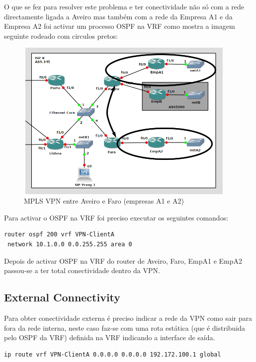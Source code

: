\documentclass[11pt,a4paper]{report}
\begin{document}
O que se fez para resolver este problema e ter conectividade não só com a rede directamente ligada a Aveiro mas também com a rede da Empresa A1 e da Empresa A2 foi activar um processo OSPF na VRF como mostra a imagem seguinte rodeado com circulos pretos:\\

\begin{figure}[H]
\centerline{\includegraphics[width=300pt]{network_vpn.png}}
\caption{MPLS VPN entre Aveiro e Faro (empresas A1 e A2)}
\label{schema}
\end{figure}

Para activar o OSPF na VRF foi preciso executar os seguintes comandos:\\

\begin{lstlisting}[caption=VPN - Suporte de OSPF entre o PE e o CE]
router ospf 200 vrf VPN-ClientA
 network 10.1.0.0 0.0.255.255 area 0
\end{lstlisting}

Depois de activar OSPF na VRF do router de Aveiro, Faro, EmpA1 e EmpA2 passou-se a ter total conectividade dentro da VPN.

\subsection{External Connectivity}

Para obter conectividade externa é preciso indicar a rede da VPN como sair para fora da rede interna, neste caso faz-se com uma rota estática (que é distribuida pelo OSPF da VRF) definida na VRF indicando a interface de saída.\\

\begin{lstlisting}[caption=VPN - Rota de saída da VPN-ClientA]
ip route vrf VPN-ClientA 0.0.0.0 0.0.0.0 192.172.100.1 global
\end{lstlisting}
\end{document}
